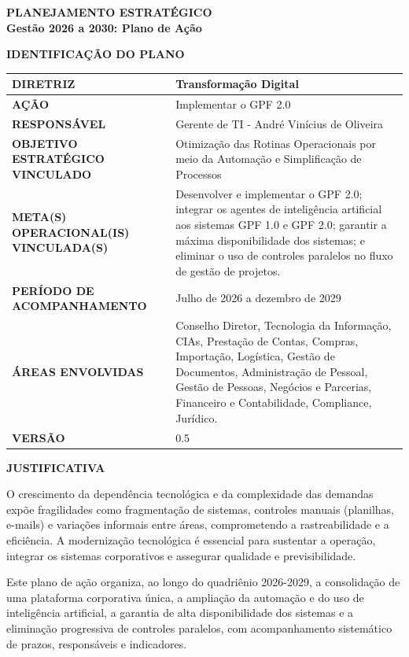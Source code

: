 \documentclass[12pt,a4paper]{article}
\newcommand{\secao}[1]{%
  \par\vspace{6pt}%
  {\noindent\bfseries\color{azulTitulo}\fontsize{13}{16}\selectfont #1}%
  \par\vspace{2pt}%
}
\begin{document}
\thispagestyle{empty}

\begin{center}
  {\bfseries\color{azulTitulo}\fontsize{17}{20}\selectfont PLANEJAMENTO ESTRATÉGICO}\\[6pt]
  {\bfseries\color{azulTitulo}\fontsize{13}{16}\selectfont Gestão 2026 a 2030: Plano de Ação}
\end{center}

\secao{IDENTIFICAÇÃO DO PLANO}

\begingroup
\small
{}
\renewcommand{\arraystretch}{1.35}
\begin{tabular}{|>{\cellcolor{azulClaro}\bfseries}p{}|p{}|}
\hline
DIRETRIZ & Transformação Digital \\
\hline
AÇÃO & Implementar o GPF 2.0 \\
\hline
RESPONSÁVEL & Gerente de TI - André Vinícius de Oliveira \\
\hline
OBJETIVO ESTRATÉGICO VINCULADO & Otimização das Rotinas Operacionais por meio da Automação e Simplificação de Processos \\
\hline
META(S) OPERACIONAL(IS) VINCULADA(S) & Desenvolver e implementar o GPF 2.0; integrar os agentes de inteligência artificial aos sistemas GPF 1.0 e GPF 2.0; garantir a máxima disponibilidade dos sistemas; e eliminar o uso de controles paralelos no fluxo de gestão de projetos. \\
\hline
PERÍODO DE ACOMPANHAMENTO & Julho de 2026 a dezembro de 2029 \\
\hline
ÁREAS ENVOLVIDAS & Conselho Diretor, Tecnologia da Informação, CIAs, Prestação de Contas, Compras, Importação, Logística, Gestão de Documentos, Administração de Pessoal, Gestão de Pessoas, Negócios e Parcerias, Financeiro e Contabilidade, Compliance, Jurídico. \\
\hline
VERSÃO & 0.5 \\
\hline
\end{tabular}
\endgroup

\secao{JUSTIFICATIVA}

O crescimento da dependência tecnológica e da complexidade das demandas expõe fragilidades como fragmentação de sistemas, controles manuais (planilhas, e-mails) e variações informais entre áreas, comprometendo a rastreabilidade e a eficiência. A modernização tecnológica é essencial para sustentar a operação, integrar os sistemas corporativos e assegurar qualidade e previsibilidade.

Este plano de ação organiza, ao longo do quadriênio 2026-2029, a consolidação de uma plataforma corporativa única, a ampliação da automação e do uso de inteligência artificial, a garantia de alta disponibilidade dos sistemas e a eliminação progressiva de controles paralelos, com acompanhamento sistemático de prazos, responsáveis e indicadores.
\end{document}
